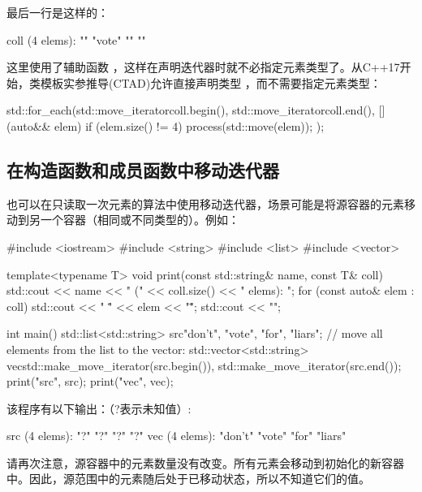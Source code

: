 最后一行是这样的：

\begin{outputcode}
coll (4 elems): "" "vote" "" ""
\end{outputcode}

这里使用了辅助函数 ，这样在声明迭代器时就不必指定元素类型了。从C++17开始，类模板实参推导(CTAD)允许直接声明类型 ，而不需要指定元素类型：

\begin{cppcode}
std::for_each(std::move_iterator{coll.begin()},
std::move_iterator{coll.end()},
[] (auto&& elem) {
	if (elem.size() != 4) {
		process(std::move(elem));
	}
});
\end{cppcode}

\subsection{在构造函数和成员函数中移动迭代器}

也可以在只读取一次元素的算法中使用移动迭代器，场景可能是将源容器的元素移动到另一个容器（相同或不同类型的）。例如：

\begin{cppcode}
#include <iostream>
#include <string>
#include <list>
#include <vector>

template<typename T>
void print(const std::string& name, const T& coll)
{
	std::cout << name << " (" << coll.size() << " elems): ";
	for (const auto& elem : coll) {
		std::cout << " \"" << elem << "\"";
	}
	std::cout << "\n";
}

int main()
{
	std::list<std::string> src{"don't", "vote", "for", "liars"};
	// move all elements from the list to the vector:
	std::vector<std::string> vec{std::make_move_iterator(src.begin()),
		std::make_move_iterator(src.end())};
	print("src", src);
	print("vec", vec);
}
\end{cppcode}

该程序有以下输出：（?表示未知值）:

\begin{outputcode}
src (4 elems): "?" "?" "?" "?"
vec (4 elems): "don't" "vote" "for" "liars"
\end{outputcode}

请再次注意，源容器中的元素数量没有改变。所有元素会移动到初始化的新容器中。因此，源范围中的元素随后处于已移动状态，所以不知道它们的值。














